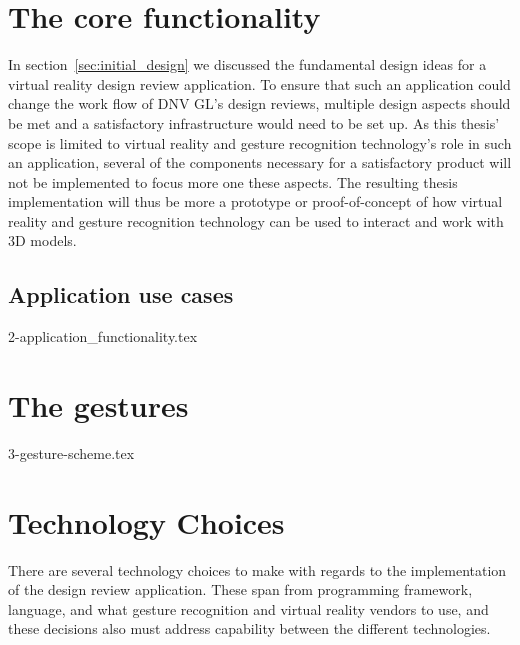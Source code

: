 \section{The core functionality} 
In section~\vref{sec:initial_design} we discussed the fundamental design ideas for a virtual reality design review application. 
To ensure that such an application could change the work flow of DNV GL's design reviews, multiple design aspects should be met and a satisfactory infrastructure would need to be
set up. As this thesis' scope is limited to virtual reality and gesture recognition technology's role in such an application, several of the components necessary for
a satisfactory product will not be implemented to focus more one these aspects. The resulting thesis implementation will thus be more a prototype or proof-of-concept of 
how virtual reality and gesture recognition technology can be used to interact and work with 3D models. 

\subsection{Application use cases}
{2-application_functionality.tex}

\section{The gestures}
\label{sec:gesture_design}
{3-gesture-scheme.tex}

\section{Technology Choices}
There are several technology choices to make with regards to the implementation of the design review application.
These span from programming framework, language, and what gesture recognition and virtual reality vendors to use, 
and these decisions also must address capability between the different technologies.

